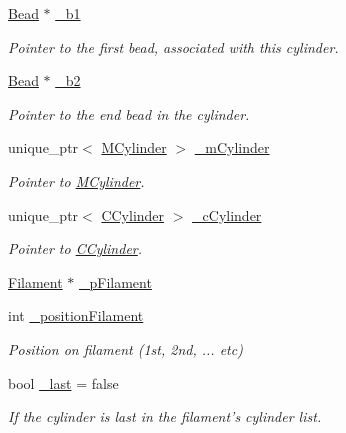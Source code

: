 \begin{DoxyCompactItemize}
\item 
\hyperlink{classBead}{Bead} $\ast$ \hyperlink{classCylinder_a74c9e6c0aaddba6e5b7058c7d58720d7}{\+\_\+b1}
\begin{DoxyCompactList}\small\item\em Pointer to the first bead, associated with this cylinder. \end{DoxyCompactList}\item 
\hyperlink{classBead}{Bead} $\ast$ \hyperlink{classCylinder_a10fe1bbf3340a35637e4a966c1035af6}{\+\_\+b2}
\begin{DoxyCompactList}\small\item\em Pointer to the end bead in the cylinder. \end{DoxyCompactList}\item 
unique\+\_\+ptr$<$ \hyperlink{classMCylinder}{M\+Cylinder} $>$ \hyperlink{classCylinder_acdd582d5e2c3ede46122e1785097e5c3}{\+\_\+m\+Cylinder}
\begin{DoxyCompactList}\small\item\em Pointer to \hyperlink{classMCylinder}{M\+Cylinder}. \end{DoxyCompactList}\item 
unique\+\_\+ptr$<$ \hyperlink{classCCylinder}{C\+Cylinder} $>$ \hyperlink{classCylinder_aacbbbcef8a8a2b6e5810884b017af516}{\+\_\+c\+Cylinder}
\begin{DoxyCompactList}\small\item\em Pointer to \hyperlink{classCCylinder}{C\+Cylinder}. \end{DoxyCompactList}\item 
\hyperlink{classFilament}{Filament} $\ast$ \hyperlink{classCylinder_a0229e3f223dc18ef21fef8db0f2f4b51}{\+\_\+p\+Filament}
\item 
int \hyperlink{classCylinder_a372ecc7b3dc54ca5dd042b043af437d6}{\+\_\+position\+Filament}
\begin{DoxyCompactList}\small\item\em Position on filament (1st, 2nd, ... etc) \end{DoxyCompactList}\item 
bool \hyperlink{classCylinder_ae06f9e43f297b9a2fef8b4b08889c852}{\+\_\+last} = false
\begin{DoxyCompactList}\small\item\em If the cylinder is last in the filament's cylinder list. \end{DoxyCompactList}\item 

\end{DoxyCompactItemize}
